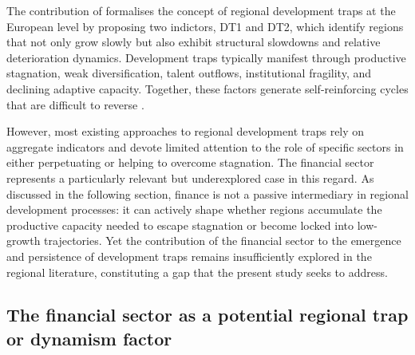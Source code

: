 \documentclass[a4paper,11pt,oneside]{article}
\begin{document}
The contribution of \citet{diemer2022regional} formalises the concept of regional development traps at the European level by proposing two indictors, DT1 and DT2, which identify regions that not only grow slowly but also exhibit structural slowdowns and relative deterioration dynamics. Development traps typically manifest through productive stagnation, weak diversification, talent outflows, institutional fragility, and declining adaptive capacity. Together, these factors generate self-reinforcing cycles that are difficult to reverse \citep{hausmann2008growth,iammarino2017regional}.


However, most existing approaches to regional development traps rely on aggregate indicators and devote limited attention to the role of specific sectors in either perpetuating or helping to overcome stagnation. The financial sector represents a particularly relevant but underexplored case in this regard. As discussed in the following section, finance is not a passive intermediary in regional development processes: it can actively shape whether regions accumulate the productive capacity needed to escape stagnation or become locked into low-growth trajectories. Yet the contribution of the financial sector to the emergence and persistence of development traps remains insufficiently explored in the regional literature, constituting a gap that the present study seeks to address.





\subsection{The financial sector as a potential regional trap or dynamism factor}

\end{document}
